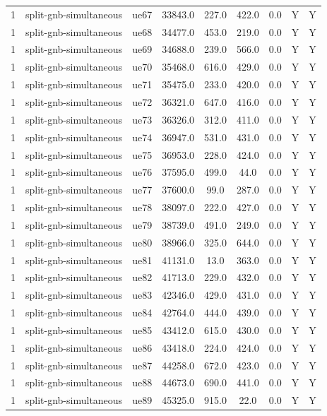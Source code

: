 \begin{table}[ht]
\begin{tabular}{|c|c|c|c|c|c|c|c|c|}
1 & split-gnb-simultaneous & ue67 & 33843.0 & 227.0 & 422.0 & 0.0 & Y & Y \\
1 & split-gnb-simultaneous & ue68 & 34477.0 & 453.0 & 219.0 & 0.0 & Y & Y \\
1 & split-gnb-simultaneous & ue69 & 34688.0 & 239.0 & 566.0 & 0.0 & Y & Y \\
1 & split-gnb-simultaneous & ue70 & 35468.0 & 616.0 & 429.0 & 0.0 & Y & Y \\
1 & split-gnb-simultaneous & ue71 & 35475.0 & 233.0 & 420.0 & 0.0 & Y & Y \\
1 & split-gnb-simultaneous & ue72 & 36321.0 & 647.0 & 416.0 & 0.0 & Y & Y \\
1 & split-gnb-simultaneous & ue73 & 36326.0 & 312.0 & 411.0 & 0.0 & Y & Y \\
1 & split-gnb-simultaneous & ue74 & 36947.0 & 531.0 & 431.0 & 0.0 & Y & Y \\
1 & split-gnb-simultaneous & ue75 & 36953.0 & 228.0 & 424.0 & 0.0 & Y & Y \\
1 & split-gnb-simultaneous & ue76 & 37595.0 & 499.0 & 44.0 & 0.0 & Y & Y \\
1 & split-gnb-simultaneous & ue77 & 37600.0 & 99.0 & 287.0 & 0.0 & Y & Y \\
1 & split-gnb-simultaneous & ue78 & 38097.0 & 222.0 & 427.0 & 0.0 & Y & Y \\
1 & split-gnb-simultaneous & ue79 & 38739.0 & 491.0 & 249.0 & 0.0 & Y & Y \\
1 & split-gnb-simultaneous & ue80 & 38966.0 & 325.0 & 644.0 & 0.0 & Y & Y \\
1 & split-gnb-simultaneous & ue81 & 41131.0 & 13.0 & 363.0 & 0.0 & Y & Y \\
1 & split-gnb-simultaneous & ue82 & 41713.0 & 229.0 & 432.0 & 0.0 & Y & Y \\
1 & split-gnb-simultaneous & ue83 & 42346.0 & 429.0 & 431.0 & 0.0 & Y & Y \\
1 & split-gnb-simultaneous & ue84 & 42764.0 & 444.0 & 439.0 & 0.0 & Y & Y \\
1 & split-gnb-simultaneous & ue85 & 43412.0 & 615.0 & 430.0 & 0.0 & Y & Y \\
1 & split-gnb-simultaneous & ue86 & 43418.0 & 224.0 & 424.0 & 0.0 & Y & Y \\
1 & split-gnb-simultaneous & ue87 & 44258.0 & 672.0 & 423.0 & 0.0 & Y & Y \\
1 & split-gnb-simultaneous & ue88 & 44673.0 & 690.0 & 441.0 & 0.0 & Y & Y \\
1 & split-gnb-simultaneous & ue89 & 45325.0 & 915.0 & 22.0 & 0.0 & Y & Y \\

\end{tabular}
\end{table}
